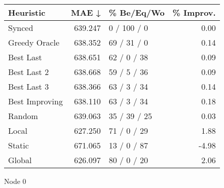 \begin{tabular}{lrlr}
\toprule
\textbf{Heuristic} & \textbf{MAE ↓} & \textbf{\% Be/Eq/Wo} & \textbf{\% Improv.} \\
\midrule
            Synced &        639.247 &          0 / 100 / 0 &                0.00 \\
     Greedy Oracle &        638.352 &          69 / 31 / 0 &                0.14 \\
         Best Last &        638.651 &          62 / 0 / 38 &                0.09 \\
       Best Last 2 &        638.668 &          59 / 5 / 36 &                0.09 \\
       Best Last 3 &        638.366 &          63 / 3 / 34 &                0.14 \\
    Best Improving &        638.110 &          63 / 3 / 34 &                0.18 \\
            Random &        639.063 &         35 / 39 / 25 &                0.03 \\
             Local &        627.250 &          71 / 0 / 29 &                1.88 \\
            Static &        671.065 &          13 / 0 / 87 &               -4.98 \\
            Global &        626.097 &          80 / 0 / 20 &                2.06 \\
\bottomrule
\end{tabular}
\caption{Node 0}
\label{tab:iid_lr01_le1_bs4_0}
